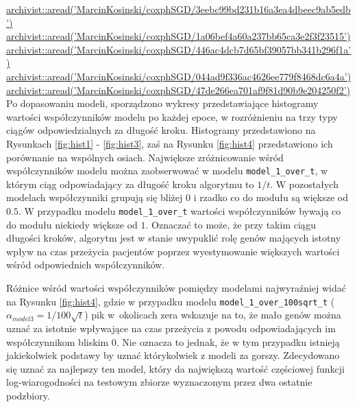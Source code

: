 \href{https://github.com/MarcinKosinski/coxphSGD/blob/master/gallery/3eebc99bd231b16a3ea4dbeec9ab5edb.rda?raw=true}{archivist::aread('MarcinKosinski/coxphSGD/3eebc99bd231b16a3ea4dbeec9ab5edb')} \\
\href{https://github.com/MarcinKosinski/coxphSGD/blob/master/gallery/1a06bef4a60a237bb65ca3e2f3f23515.rda?raw=true}{archivist::aread('MarcinKosinski/coxphSGD/1a06bef4a60a237bb65ca3e2f3f23515')} \\
\href{https://github.com/MarcinKosinski/coxphSGD/blob/master/gallery/446ac4dcb7d65bf39057bb341b296f1a.rda?raw=true}{archivist::aread('MarcinKosinski/coxphSGD/446ac4dcb7d65bf39057bb341b296f1a')} \\
\href{https://github.com/MarcinKosinski/coxphSGD/blob/master/gallery/044ad9f336ac4626ee779f8468dc6a4a.rda?raw=true}{archivist::aread('MarcinKosinski/coxphSGD/044ad9f336ac4626ee779f8468dc6a4a')} \\
\href{https://github.com/MarcinKosinski/coxphSGD/blob/master/gallery/47de266ea701af9f81d90b9e204250f2.rda?raw=true}{archivist::aread('MarcinKosinski/coxphSGD/47de266ea701af9f81d90b9e204250f2')} \\

Po dopasowaniu modeli, sporządzono wykresy przedstawiające histogramy wartości współczynników modelu po każdej epoce, w rozróżnieniu na trzy typy ciągów odpowiedzialnych za długość kroku. Histogramy przedstawiono na Rysunkach \ref{fig:hist1} - \ref{fig:hist3}, zaś na Rysunku \ref{fig:hist4} przedstawiono ich porównanie na wspólnych osiach. Największe zróżnicowanie wśród współczynników modelu można zaobserwować w modelu \texttt{model\_1\_over\_t}, w którym ciąg odpowiadający za długość kroku algorytmu to $1/t$. W pozostałych modelach współczynniki grupują się bliżej $0$ i rzadko co do modułu są większe od $0.5$. W przypadku modelu \texttt{model\_1\_over\_t} wartości współczynników bywają co do modułu niekiedy większe od $1$. Oznaczać to może, że przy takim ciągu długości kroków, algorytm jest w stanie uwypuklić rolę genów mających istotny wpływ na czas przeżycia pacjentów poprzez wyestymowanie większych wartości wśród odpowiednich współczynników. 

Różnice wśród wartości współczynników pomiędzy modelami najwyraźniej widać na Rysunku \ref{fig:hist4}, gdzie w przypadku modelu \texttt{model\_1\_over\_100sqrt\_t} ($\alpha_{model3} = 1/100\sqrt{t}$) pik w~okolicach zera wskazuje na to, że mało genów można uznać za istotnie wpływające na czas przeżycia z powodu odpowiadających im współczynnikom bliskim $0$. Nie oznacza to jednak, że w tym przypadku istnieją jakiekolwiek podstawy by uznać którykolwiek z modeli za gorszy. Zdecydowano się uznać za najlepszy ten model, który da największą wartość częściowej funkcji log-wiarogodności na testowym zbiorze wyznaczonym przez dwa ostatnie podzbiory.\vspace{-8pt}
